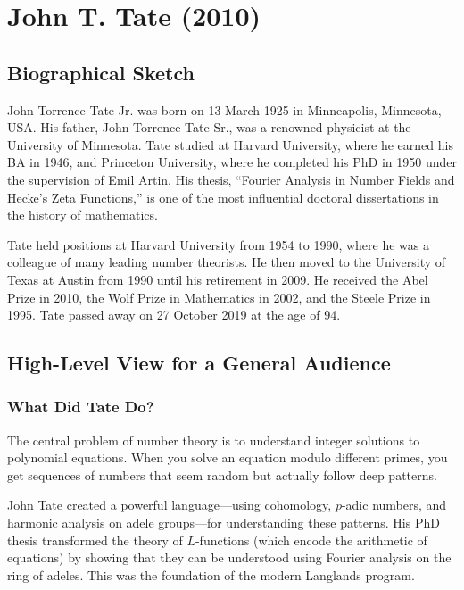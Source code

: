 \chapter{John T. Tate (2010)}

\section{Biographical Sketch}



John Torrence Tate Jr. was born on 13 March 1925 in Minneapolis, Minnesota, USA. His father, John Torrence Tate Sr., was a renowned physicist at the University of Minnesota. Tate studied at Harvard University, where he earned his BA in 1946, and Princeton University, where he completed his PhD in 1950 under the supervision of Emil Artin. His thesis, ``Fourier Analysis in Number Fields and Hecke's Zeta Functions,'' is one of the most influential doctoral dissertations in the history of mathematics.

Tate held positions at Harvard University from 1954 to 1990, where he was a colleague of many leading number theorists. He then moved to the University of Texas at Austin from 1990 until his retirement in 2009. He received the Abel Prize in 2010, the Wolf Prize in Mathematics in 2002, and the Steele Prize in 1995. Tate passed away on 27 October 2019 at the age of 94.

\section{High-Level View for a General Audience}

\subsection{What Did Tate Do?}

The central problem of number theory is to understand integer solutions to polynomial equations. When you solve an equation modulo different primes, you get sequences of numbers that seem random but actually follow deep patterns.

John Tate created a powerful language---using cohomology, $p$-adic numbers, and harmonic analysis on adele groups---for understanding these patterns. His PhD thesis transformed the theory of $L$-functions (which encode the arithmetic of equations) by showing that they can be understood using Fourier analysis on the ring of adeles. This was the foundation of the modern Langlands program.

